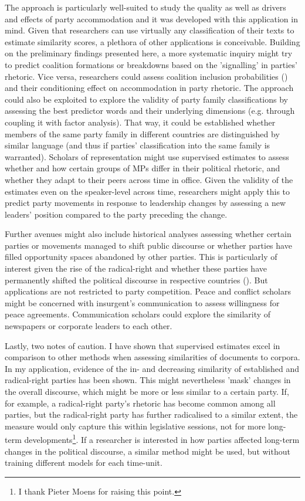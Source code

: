 \documentclass{article}
\begin{document}
The approach is particularly well-suited to study the quality as well as drivers and effects of party accommodation and it was developed with this application in mind. Given that researchers can use virtually any classification of their texts to estimate similarity scores, a plethora of other applications is conceivable. Building on the preliminary findings presented here, a more systematic inquiry might try to predict coalition formations or breakdowns based on the 'signalling' in parties' rhetoric. Vice versa, researchers could assess coalition inclusion probabilities (\cite{Kayser2019Coalition}) and their conditioning effect on accommodation in party rhetoric. The approach could also be exploited to explore the validity of party family classifications by assessing the best predictor words and their underlying dimensions (e.g. through coupling it with factor analysis). That way, it could be established whether members of the same party family in different countries are distinguished by similar language (and thus if parties' classification into the same family is warranted). Scholars of representation might use supervised estimates to assess whether and how certain groups of MPs differ in their political rhetoric, and whether they adapt to their peers across time in office. Given the validity of the estimates even on the speaker-level across time, researchers might apply this to predict party movements in response to leadership changes by assessing a new leaders' position compared to the party preceding the change. \par

Further avenues might also include historical analyses assessing whether certain parties or movements managed to shift public discourse or whether parties have filled opportunity spaces abandoned by other parties. This is particularly of interest given the rise of the radical-right and whether these parties have permanently shifted the political discourse in respective countries (\cite{Wagner2017}). But applications are not restricted to party competition. Peace and conflict scholars might be concerned with insurgent's communication to assess willingness for peace agreements. Communication scholars could explore the similarity of newspapers or corporate leaders to each other.\par

Lastly, two notes of caution. I have shown that supervised estimates excel in comparison to other methods when assessing similarities of documents to corpora. In my application, evidence of the in- and decreasing similarity of established and radical-right parties has been shown. This might nevertheless 'mask' changes in the overall discourse, which might be more or less similar to a certain party. If, for example, a radical-right party's rhetoric has become common among all parties, but the radical-right party has further radicalised to a similar extent, the measure would only capture this within legislative sessions, not for more long-term developments\footnote{I thank Pieter Moens for raising this point.}. If a researcher is interested in how parties affected long-term changes in the political discourse, a similar method might be used, but without training different models for each time-unit.\par
\end{document}

